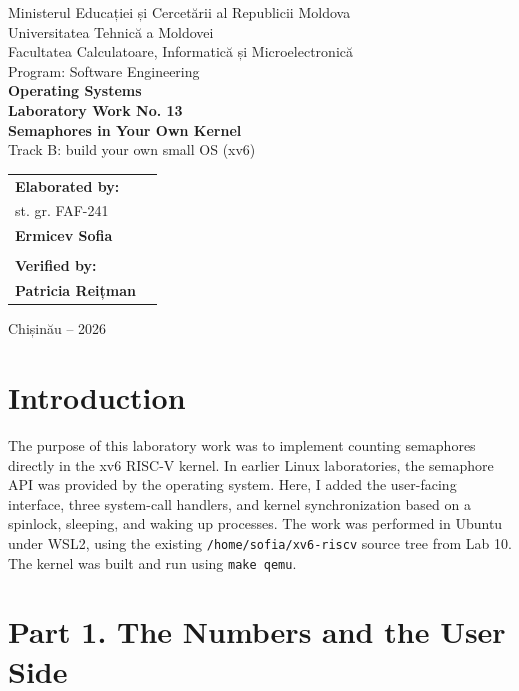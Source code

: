 \documentclass[12pt,a4paper]{article}
\begin{document}
\begin{titlepage}\begin{center}
{\large Ministerul Educației și Cercetării al Republicii Moldova}\\[0.3cm]
{\large Universitatea Tehnică a Moldovei}\\[0.3cm]
{\large Facultatea Calculatoare, Informatică și Microelectronică}\\[0.3cm]
{\large Program: Software Engineering}\\[2.3cm]
{\Large\textbf{Operating Systems}}\\[0.8cm]
{\LARGE\textbf{Laboratory Work No. 13}}\\[0.5cm]
{\Large\textbf{Semaphores in Your Own Kernel}}\\[0.35cm]
{\large Track B: build your own small OS (xv6)}
\vfill
\begin{flushright}\begin{tabular}{ll}
\textbf{Elaborated by:} & \\
st. gr. FAF-241 & \\
\textbf{Ermicev Sofia} & \\
\\
\textbf{Verified by:} & \\
\textbf{Patricia Reițman} &
\end{tabular}\end{flushright}
\vfill {\large Chișinău -- 2026}
\end{center}\end{titlepage}
\tableofcontents\newpage

\section{Introduction}
The purpose of this laboratory work was to implement counting semaphores directly in the xv6 RISC-V kernel. In earlier Linux laboratories, the semaphore API was provided by the operating system. Here, I added the user-facing interface, three system-call handlers, and kernel synchronization based on a spinlock, sleeping, and waking up processes. The work was performed in Ubuntu under WSL2, using the existing \texttt{/home/sofia/xv6-riscv} source tree from Lab 10. The kernel was built and run using \texttt{make qemu}.

\section{Part 1. The Numbers and the User Side}
\end{document}

